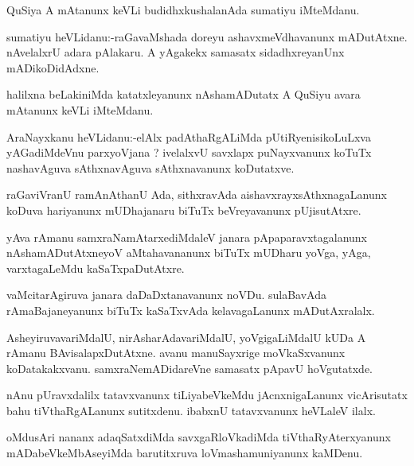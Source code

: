 \documentclass{article}
\begin{document}
\begin{mn}%
QuSiya A mAtanunx keVLi budidhxkushalanAda sumatiyu iMteMdanu.
\end{mn}

\begin{mn}%
sumatiyu heVLidanu:-raGavaMshada doreyu ashavxmeVdhavanunx mADutAtxne. nAvelalxrU adara 
pAlakaru. A yAgakekx samasatx sidadhxreyanUnx mADikoDidAdxne.
\end{mn}

\begin{mn}%
halilxna beLakiniMda katatxleyanunx nAshamADutatx A QuSiyu avara mAtanunx keVLi iMteMdanu.
\end{mn}

\begin{mn}%
AraNayxkanu heVLidanu:-elAlx padAthaRgALiMda pUtiRyenisikoLuLxva yAGadiMdeVnu parxyoVjana ? 
ivelalxvU savxlapx puNayxvanunx koTuTx nashavAguva sAthxnavAguva sAthxnavanunx koDutatxve.
\end{mn}

\begin{mn}%
raGaviVranU ramAnAthanU Ada, sithxravAda aishavxrayxsAthxnagaLanunx koDuva hariyanunx 
mUDhajanaru biTuTx beVreyavanunx pUjisutAtxre.
\end{mn}

\begin{mn}%
yAva rAmanu samxraNamAtarxediMdaleV janara pApaparavxtagalanunx nAshamADutAtxneyoV 
aMtahavananunx biTuTx mUDharu yoVga, yAga, varxtagaLeMdu kaSaTxpaDutAtxre.
\end{mn}

\begin{mn}%
vaMcitarAgiruva janara daDaDxtanavanunx noVDu. sulaBavAda rAmaBajaneyanunx biTuTx 
kaSaTxvAda kelavagaLanunx mADutAxralalx.
\end{mn}

\begin{mn}%
AsheyiruvavariMdalU, nirAsharAdavariMdalU, yoVgigaLiMdalU kUDa A rAmanu 
BAvisalapxDutAtxne. avanu manuSayxrige moVkaSxvanunx koDatakakxvanu. samxraNemADidareVne 
samasatx pApavU hoVgutatxde.
\end{mn}

\begin{mn}%
nAnu pUravxdalilx tatavxvanunx tiLiyabeVkeMdu jAcnxnigaLanunx vicArisutatx bahu 
tiVthaRgALanunx sutitxdenu. ibabxnU tatavxvanunx heVLaleV ilalx. 
\end{mn}

\begin{mn}%
oMdusAri nananx adaqSatxdiMda savxgaRloVkadiMda tiVthaRyAterxyanunx mADabeVkeMbAseyiMda 
barutitxruva loVmashamuniyanunx kaMDenu.
\end{mn}
\end{document}
